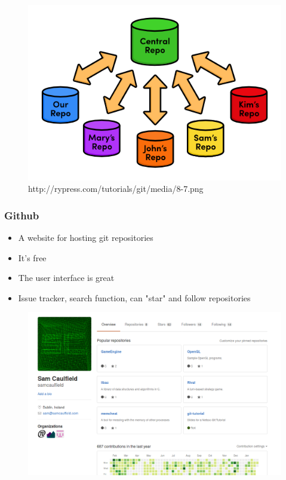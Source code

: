\documentclass{beamer}
\begin{document}
\begin{frame}
\begin{figure}
\begin{center}
\includegraphics[scale=0.7]{centralised}
\caption{http://rypress.com/tutorials/git/media/8-7.png}
\end{center}
\end{figure}
\end{frame}

\begin{frame}
\frametitle{Github}
\begin{itemize}
\item A website for hosting git repositories
\item It's free
\item The user interface is great
\item Issue tracker, search function, can "star" and follow repositories
\end{itemize}
\end{frame}

\begin{frame}
\begin{figure}
\begin{center}
\includegraphics[scale=0.3]{githubmain}
\end{center}
\end{figure}
\end{frame}
\end{document}

